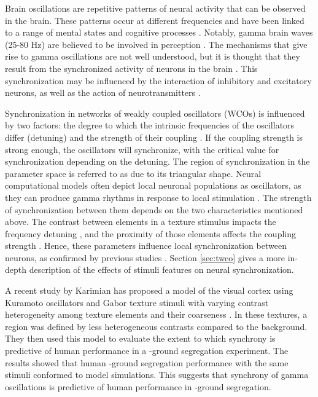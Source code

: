 Brain oscillations are repetitive patterns of neural activity that can be observed in the brain. These patterns occur at different frequencies and have been linked to a range of mental states and cognitive processes \cite{BuzsakiBook2006:5}. Notably, gamma brain waves (25-80 Hz) are believed to be involved in perception \cite{Eckhorn1988, Gray1989, Kreiter1996, Livingstone1996, Fries1997, Gail2000}. The mechanisms that give rise to gamma oscillations are not well understood, but it is thought that they result from the synchronized activity of neurons in the brain \cite{Wang1996, Buzsaki2012, Fries2015}. This synchronization may be influenced by the interaction of inhibitory and excitatory neurons, as well as the action of neurotransmitters \cite{Fries2007, Tiesinga2009, Tiesinga2010}. 

Synchronization in networks of weakly coupled oscillators (WCOs) is influenced by two factors: the degree to which the intrinsic frequencies of the oscillators differ (detuning) and the strength of their coupling \cite{Pikovsky2002, Tiesinga2010, Lowet2015}. If the coupling strength is strong enough, the oscillators will synchronize, with the critical value for synchronization depending on the detuning. The region of synchronization in the parameter space is referred to as  due to its triangular shape.
Neural computational models often depict local neuronal populations as oscillators, as they can produce gamma rhythms in response to local stimulation \cite{IzhikevichBook2004:9}. The strength of synchronization between them depends on the two characteristics mentioned above. The contrast between elements in a texture stimulus impacts the frequency detuning \cite{Lowet2017, Ray2010}, and the proximity of those elements affects the coupling strength \cite{Gilbert1983, Tso1986a, Lowet2015, Lowet2017, Stettler2002, MaryamPLACEHOLDER}. Hence, these parameters influence local synchronization between neurons, as confirmed by previous studies \cite{Lowet2017, MaryamPLACEHOLDER}. Section \ref{sec:twco} gives a more in-depth description of the effects of stimuli features on neural synchronization.

A recent study by Karimian has proposed a model of the visual cortex using Kuramoto oscillators and Gabor texture stimuli with varying contrast heterogeneity among texture elements and their coarseness \cite{MaryamPLACEHOLDER}. In these textures, a \stimfig{} region was defined by less heterogeneous contrasts compared to the background.
They then used this model to evaluate the extent to which synchrony is predictive of human performance in a \stimfig-ground segregation experiment. The results showed that human \stimfig-ground segregation performance with the same stimuli conformed to model simulations. This suggests that synchrony of gamma oscillations is predictive of human performance in \stimfig-ground segregation. 

